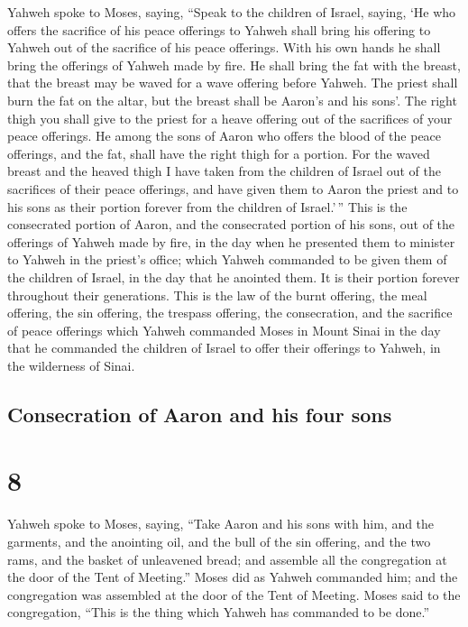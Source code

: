  Yahweh spoke to Moses, saying,  ``Speak
to the children of Israel, saying, `He who offers the sacrifice of his
peace offerings to Yahweh shall bring his offering to Yahweh out of the
sacrifice of his peace offerings.  With his own hands he
shall bring the offerings of Yahweh made by fire. He shall bring the fat
with the breast, that the breast may be waved for a wave offering before
Yahweh.  The priest shall burn the fat on the altar, but
the breast shall be Aaron's and his sons'.  The right
thigh you shall give to the priest for a heave offering out of the
sacrifices of your peace offerings.  He among the sons of
Aaron who offers the blood of the peace offerings, and the fat, shall
have the right thigh for a portion.  For the waved breast
and the heaved thigh I have taken from the children of Israel out of the
sacrifices of their peace offerings, and have given them to Aaron the
priest and to his sons as their portion forever from the children of
Israel.'\,''  This is the consecrated portion of Aaron,
and the consecrated portion of his sons, out of the offerings of Yahweh
made by fire, in the day when he presented them to minister to Yahweh in
the priest's office;  which Yahweh commanded to be given
them of the children of Israel, in the day that he anointed them. It is
their portion forever throughout their generations.  This
is the law of the burnt offering, the meal offering, the sin offering,
the trespass offering, the consecration, and the sacrifice of peace
offerings  which Yahweh commanded Moses in Mount Sinai in
the day that he commanded the children of Israel to offer their
offerings to Yahweh, in the wilderness of Sinai.

\hypertarget{consecration-of-aaron-and-his-four-sons}{%
\subsection{Consecration of Aaron and his four
sons}\label{consecration-of-aaron-and-his-four-sons}}

\hypertarget{section-7}{%
\section{8}\label{section-7}}

 Yahweh spoke to Moses, saying,  ``Take
Aaron and his sons with him, and the garments, and the anointing oil,
and the bull of the sin offering, and the two rams, and the basket of
unleavened bread;  and assemble all the congregation at
the door of the Tent of Meeting.''  Moses did as Yahweh
commanded him; and the congregation was assembled at the door of the
Tent of Meeting.  Moses said to the congregation, ``This
is the thing which Yahweh has commanded to be done.''

